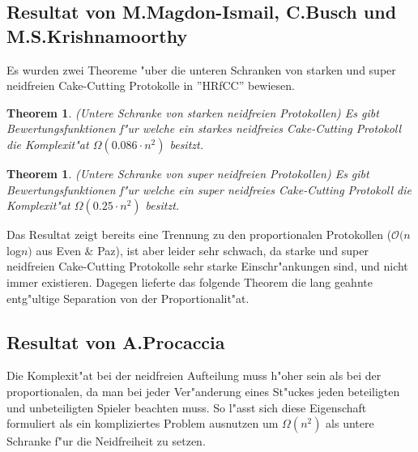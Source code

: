 \documentclass[11pt, a4paper, twoside]{article}
\newtheorem{thm}[satz]{Theorem}
\numberwithin{equation}{section}
\begin{document}
\subsection{Resultat von M.Magdon-Ismail, C.Busch und\\M.S.Krishnamoorthy}
Es wurden zwei Theoreme "uber die unteren Schranken von starken und super neidfreien Cake-Cutting Protokolle in ''HRfCC'' bewiesen.
\begin{thm}(Untere Schranke von starken neidfreien Protokollen)
\newline Es gibt Bewertungsfunktionen f"ur welche ein starkes neidfreies Cake-Cutting Protokoll die Komplexit"at $\Omega(0.086\cdot n^2)$ besitzt.
\end{thm}
\begin{thm}(Untere Schranke von super neidfreien Protokollen)
\newline Es gibt Bewertungsfunktionen f"ur welche ein super neidfreies Cake-Cutting Protokoll die Komplexit"at $\Omega(0.25\cdot n^2)$ besitzt.
\end{thm}
Das Resultat zeigt bereits eine Trennung zu den proportionalen Protokollen ($\mathcal O(n$log$ n)$ aus Even $\&$ Paz), ist aber leider sehr schwach, da starke und super neidfreien Cake-Cutting Protokolle sehr starke Einschr"ankungen sind, und nicht immer existieren. Dagegen lieferte das folgende Theorem die lang geahnte entg"ultige Separation von der Proportionalit"at.   
\subsection{Resultat von A.Procaccia}
Die Komplexit"at bei der neidfreien Aufteilung muss h"oher sein als bei der proportionalen, da man bei jeder Ver"anderung eines St"uckes jeden beteiligten und unbeteiligten Spieler beachten muss. So l"asst sich diese Eigenschaft formuliert als ein kompliziertes Problem ausnutzen um $\Omega( n^2)$ als untere Schranke f"ur die Neidfreiheit zu setzen.
\newline
\newline
\newline
\newpage
\end{document}
